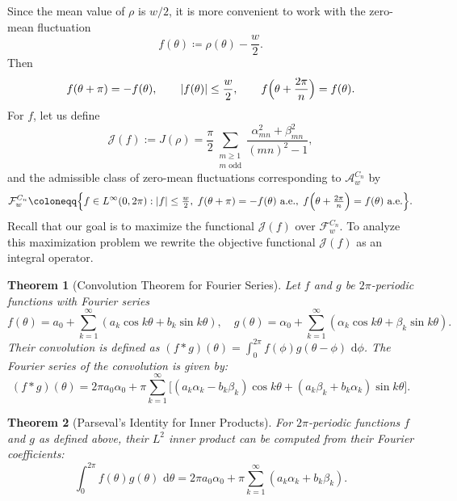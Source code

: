 \documentclass[11pt,letterpaper,reqno]{amsart}
\newcommand{\dd}{\,\mathrm{d}}
\newtheorem{theorem}{Theorem}[section]
\begin{document}
Since the mean value of $\rho$ is $w/2$, it is more convenient to work with the zero-mean fluctuation
\begin{equation*} 
    f(\theta)\coloneqq \rho(\theta)-\frac w2.
\end{equation*}
Then
\[
f(\theta+\pi)=-f(\theta),\qquad |f(\theta)|\le \frac w2,
\qquad f\Bigl(\theta+\frac{2\pi}{n}\Bigr)=f(\theta).
\]
For $f$, let us define
\begin{equation}\label{I}
\mathcal J(f) := J(\rho)=\frac{\pi}{2}\sum_{\substack{m\ge1\\m\text{ odd}}}
\frac{\alpha_{mn}^2+\beta_{mn}^2}{(mn)^2-1}, 
\end{equation}
and the admissible class of zero-mean fluctuations corresponding to $\mathcal A_w^{C_n}$ by
\[
\mathcal F_w^{C_n}
\coloneqq
\Bigl\{f\in L^\infty(0,2\pi):
|f|\le \tfrac w2,\;
f(\theta+\pi)=-f(\theta)\text{ a.e.},\;
f\Bigl(\theta+\tfrac{2\pi}{n}\Bigr)=f(\theta)\text{ a.e.}
\Bigr\}.
\]
Recall that our goal is to maximize the functional $\mathcal J(f)$
over $\mathcal F_w^{C_n}$. To analyze this maximization problem we rewrite the objective functional $\mathcal J(f)$ as an integral operator.

\begin{explanation}

\begin{theorem}[Convolution Theorem for Fourier Series]
Let $f$ and $g$ be $2\pi$-periodic functions with Fourier series
\[
f(\theta) = a_0 + \sum_{k=1}^\infty (a_k\cos k\theta + b_k\sin k\theta), \quad g(\theta) = \alpha_0 + \sum_{k=1}^\infty (\alpha_k\cos k\theta + \beta_k\sin k\theta).
\]
Their convolution is defined as $(f*g)(\theta) = \int_0^{2\pi} f(\phi)g(\theta-\phi)\,\dd\phi$. The Fourier series of the convolution is given by:
\[
(f*g)(\theta) = 2\pi a_0\alpha_0 + \pi \sum_{k=1}^\infty \bigl[ (a_k\alpha_k - b_k\beta_k)\cos k\theta + (a_k\beta_k + b_k\alpha_k)\sin k\theta \bigr].
\]
\end{theorem}

\begin{theorem}[Parseval's Identity for Inner Products]
For $2\pi$-periodic functions $f$ and $g$ as defined above, their $L^2$ inner product can be computed from their Fourier coefficients:
\[
\int_0^{2\pi} f(\theta)g(\theta)\,\dd\theta = 2\pi a_0\alpha_0 + \pi \sum_{k=1}^\infty (a_k\alpha_k + b_k\beta_k).
\]
\end{theorem}
\end{explanation}
\end{document}
